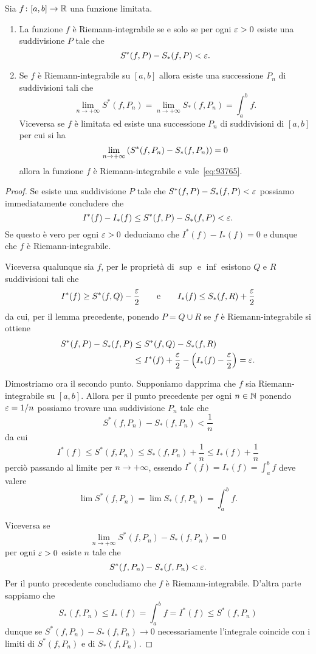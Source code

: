 \begin{theorem}
\label{th:criteri_integrabilita}%
\mymark{*}%
%
%
Sia $f\colon[a,b]\to {\mathbb R}$ una funzione limitata.
\begin{enumerate}
\item
La funzione $f$ è Riemann-integrabile se e solo se
per ogni $\varepsilon>0$ esiste una suddivisione $P$
tale che
\[
  S^*(f,P) - S_*(f,P) < \varepsilon.
\]

\item
Se $f$ è Riemann-integrabile su $[a,b]$ allora
esiste una successione $P_n$ di suddivisioni tali che
\begin{equation}\label{eq:93765}
  \lim_{n\to +\infty} S^*(f,P_n)
  = \lim_{n\to+\infty} S_*(f,P_n)
  = \int_a^b f.
\end{equation}
Viceversa se $f$ è limitata ed esiste una successione $P_n$ 
di suddivisioni di $[a,b]$ per cui si ha
\begin{equation*}
  \lim_{n\to +\infty} {\left( S^*(f,P_n) - S_*(f,P_n) \right)} = 0
\end{equation*}
allora la funzione $f$ è Riemann-integrabile e vale~\eqref{eq:93765}.
\end{enumerate}
\end{theorem}
%
\begin{proof}
Se esiste una suddivisione $P$ tale che $S^*(f,P)-S_*(f,P) < \varepsilon$ possiamo immediatamente concludere che
\[
I^*(f) - I_*(f) \le S^*(f,P) - S_*(f,P) < \varepsilon.
\]
Se questo è vero per ogni $\varepsilon >0$ deduciamo che $I^*(f) - I_*(f) = 0$ e dunque che $f$ è Riemann-integrabile.

Viceversa qualunque sia $f$, per le proprietà
di $\sup$ e $\inf$
esistono $Q$ e $R$ suddivisioni tali che
\[
  I^*(f) \ge S^*(f,Q) - \frac{\varepsilon} 2
  \qquad\text{e}\qquad
  I_*(f) \le S_*(f,R) + \frac{\varepsilon} 2
\]
da cui, per il lemma precedente, ponendo $P=Q\cup R$
se $f$ è Riemann-integrabile
si ottiene
\begin{align*}
S^*(f,P)-S_*(f,P) 
&\le S^*(f,Q) - S_*(f,R) \\
&\le I^*(f) + \frac{\varepsilon} 2 - {\left( I_*(f) - \frac {\varepsilon} 2 \right)} = \varepsilon.
\end{align*}

Dimostriamo ora il secondo punto.
Supponiamo dapprima che $f$ sia Riemann-integrabile su $[a,b]$.
Allora per il punto precedente per ogni $n\in {\mathbb N}$ ponendo $\varepsilon=1/n$ possiamo trovare una suddivisione $P_n$ tale che
\[
  S^*(f,P_n) - S_*(f,P_n) < \frac 1 n
\]
da cui
\[
  I^*(f) \le S^*(f,P_n) \le S_*(f,P_n) + \frac 1 n
   \le I_*(f) + \frac 1 n
\]
perciò passando al limite per $n\to +\infty$,
essendo $I^*(f) = I_*(f) = \int_a^b f$ deve valere
\[
  \lim S^*(f,P_n) = \lim S_*(f,P_n) = \int_a^b f.
\]

Viceversa se
\[
 \lim_{n\to +\infty} S^*(f,P_n) - S_*(f,P_n) = 0
\]
per ogni $\varepsilon>0$ esiste $n$ tale che
\[
  S^*(f,P_n) - S_*(f,P_n) < \varepsilon.
\]
Per il punto precedente concludiamo che $f$ è Riemann-integrabile.
D'altra parte sappiamo che
\[
  S_*(f,P_n) \le I_*(f) = \int_a^b f = I^*(f) \le S^*(f,P_n)
\]
dunque se $S^*(f,P_n) - S_*(f,P_n) \to 0$ necessariamente
l'integrale coincide con i limiti di $S^*(f,P_n)$ e di
$S_*(f,P_n)$.
\end{proof}

